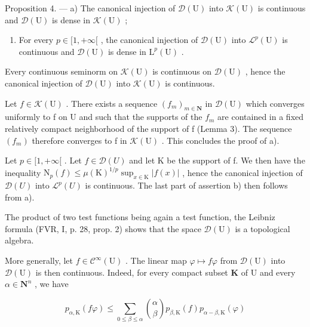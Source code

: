 Proposition 4. --- a) The canonical injection of \(\mathcal{D}(\mathrm{U})\) into \(\mathcal{K}(\mathrm{U})\) is continuous and \(\mathcal{D}(\mathrm{U})\) is dense in \(\mathcal{K}(\mathrm{U})\) ;

\begin{enumerate}
\def\labelenumi{\alph{enumi})}
\setcounter{enumi}{1}
\tightlist
\item
  For every \(p \in [1, +\infty[\) , the canonical injection of \(\mathcal{D}(\mathrm{U})\) into \(\mathcal{L}^p(\mathrm{U})\) is continuous and \(\mathcal{D}(\mathrm{U})\) is dense in \(\mathrm{L}^p(\mathrm{U})\) .
\end{enumerate}

Every continuous seminorm on \(\mathcal{K}(\mathrm{U})\) is continuous on \(\mathcal{D}(\mathrm{U})\) , hence the canonical injection of \(\mathcal{D}(\mathrm{U})\) into \(\mathcal{K}(\mathrm{U})\) is continuous.

Let \(f \in \mathcal{K}(\mathrm{U})\) . There exists a sequence \((f_{m})_{m \in \mathbf{N}}\) in \(\mathcal{D}(\mathrm{U})\) which converges uniformly to f on U and such that the supports of the \(f_{m}\) are contained in a fixed relatively compact neighborhood of the support of f (Lemma 3). The sequence \((f_{m})\) therefore converges to f in \(\mathcal{K}(\mathrm{U})\) . This concludes the proof of a).

Let \(p \in [1, +\infty[\) . Let \(f \in \mathcal{D}(U)\) and let K be the support of f. We then have the inequality \(\mathrm{N}_{p}(f) \leqslant \mu(\mathrm{K})^{1/p} \sup_{x \in \mathrm{K}} |f(x)|\) , hence the canonical injection of \(\mathcal{D}(U)\) into \(\mathcal{L}^{p}(U)\) is continuous. The last part of assertion b) then follows from a).

The product of two test functions being again a test function, the Leibniz formula (FVR, I, p. 28, prop. 2) shows that the space \(\mathcal{D}(\mathrm{U})\) is a topological algebra.

More generally, let \(f \in \mathcal{C}^{\infty}(\mathrm{U})\) . The linear map \(\varphi \mapsto f\varphi\) from \(\mathcal{D}(\mathrm{U})\) into \(\mathcal{D}(\mathrm{U})\) is then continuous. Indeed, for every compact subset \(\mathbf{K}\) of \(\mathrm{U}\) and every \(\alpha \in \mathbf{N}^{n}\) , we have

\[
p _ {\alpha , \mathrm{K}} (f \varphi) \leqslant \sum_ {0 \leqslant \beta \leqslant \alpha} \binom {\alpha} {\beta} p _ {\beta , \mathrm{K}} (f) p _ {\alpha - \beta , \mathrm{K}} (\varphi)
\]

